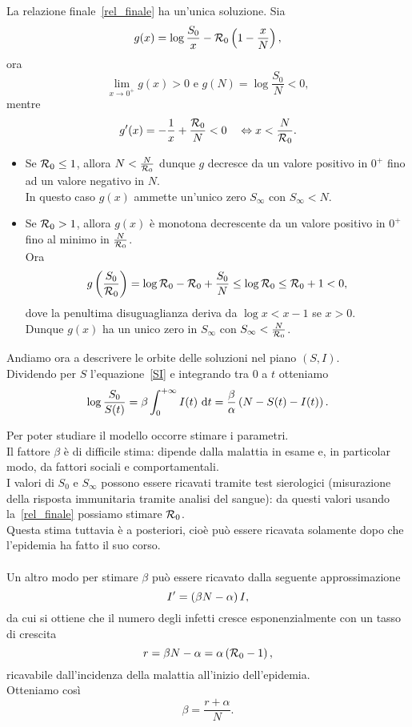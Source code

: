 \begin{prop}
La relazione finale~\eqref{rel_finale}  ha un'unica soluzione.
\proof 
Sia 
$$ g(x) =\log \frac{S_0}{x} -\mathcal R_0 \left(  1 -\frac{x}{N} \right), $$
ora 
$$\lim_{x\to 0^+} g(x)>0 \text{  e }  g(N) =\log\frac{S_0}{N} < 0, $$ 
mentre
$$g'(x)=-\frac{1}{x} + \frac{\mathcal R_0}{N} < 0\quad \Leftrightarrow x < \frac{N}{\mathcal R_0}. $$
\begin{itemize}
	\item Se $\mathcal R_0\leq 1 $,   allora $N < \frac{N}{\mathcal R_0}$ dunque $g$ decresce da un valore positivo in $0^+$  fino ad un valore negativo in $N$.\\
	In questo caso  $g(x)$ ammette un'unico zero   $S_\infty$ con $S_\infty< N $.
	\item Se $\mathcal R_0 >1$, allora $g(x)$ \`e monotona decrescente da un valore positivo in $0^+$ fino al minimo in $\frac{N}{\mathcal R_0}$.\\
Ora
$$ g\left(  \frac{S_0}{\mathcal R_0} \right) =\log \mathcal R_0 - \mathcal R_0 +\frac{S_0}{N}\leq \log \mathcal R_0 \leq  \mathcal R_0 + 1 <0,$$
dove la penultima disuguaglianza deriva da $\log x < x - 1$ se $x>0$.\\
Dunque $g(x)$ ha un unico zero in $S_\infty$ con $S_\infty< \frac{N}{\mathcal R_0}$.
\end{itemize}
\endproof	
\end{prop}

\vspace{0.5 cm}

Andiamo ora a descrivere le orbite delle soluzioni nel piano $(S,I)$.\\
Dividendo per $S$  l'equazione~\eqref{SI} e integrando tra $0$ a $t$ otteniamo 
$$ \log \frac{S_0}{S(t)} =\beta \int_0^{+\infty } I(t) \,\,\mathrm{d} t = \frac{\beta}{\alpha} \left(  N- S(t) - I(t) \right).$$ 
\newpage

Per poter studiare il modello occorre stimare i parametri.\\ Il fattore $\beta$ \`e di difficile stima: dipende dalla malattia in esame e,  in particolar modo, da fattori sociali e comportamentali.\\
I valori di $S_0$ e $S_\infty$ possono essere ricavati tramite test sierologici (misurazione della risposta immunitaria tramite analisi del sangue): da questi valori usando la~\eqref{rel_finale} possiamo stimare $\mathcal R_0$.\\
Questa stima tuttavia \`e a posteriori, cio\`e pu\`o essere ricavata solamente dopo che l'epidemia ha fatto il suo corso.\\ \\
Un altro modo per stimare $\beta$ pu\`o essere ricavato dalla seguente approssimazione
$$ I' = \left(  \beta N -\alpha  \right) I,$$ 
da cui si ottiene che il numero degli infetti cresce esponenzialmente con un tasso di crescita 
$$ r =\beta N - \alpha = \alpha \left(  \mathcal R_0 -1 \right),$$
ricavabile dall'incidenza della malattia  all'inizio dell'epidemia.\\Otteniamo cos\`i 
$$ \beta = \frac{r + \alpha } {N}.$$
 

